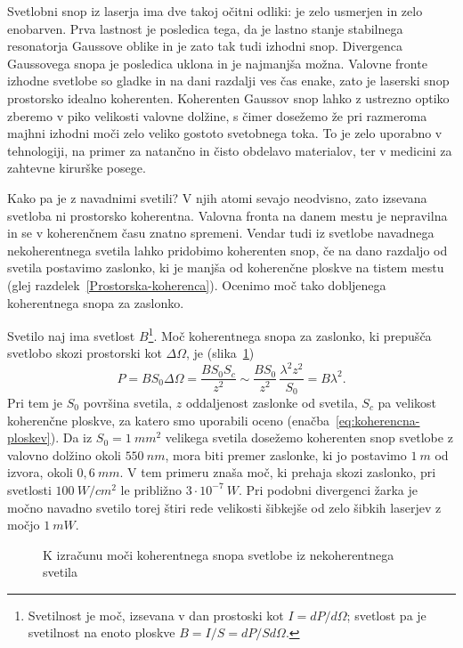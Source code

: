 Svetlobni snop iz laserja ima dve takoj očitni odliki: je zelo
usmerjen in zelo enobarven. Prva lastnost je posledica tega, da je
lastno stanje stabilnega resonatorja Gaussove oblike in je zato tak tudi
izhodni snop. Divergenca Gaussovega snopa je posledica uklona in je 
najmanjša možna. Valovne fronte izhodne svetlobe so gladke in na dani razdalji ves 
čas enake, zato je laserski snop prostorsko idealno koherenten. 
Koherenten Gaussov snop lahko z ustrezno optiko zberemo v piko velikosti
valovne dolžine, s čimer dosežemo že pri razmeroma majhni izhodni moči zelo veliko
gostoto svetobnega toka. To je zelo uporabno v tehnologiji, na primer za natančno in
čisto obdelavo materialov, ter v medicini za
zahtevne kirurške posege.

Kako pa je z navadnimi svetili? V njih atomi sevajo neodvisno, zato
izsevana svetloba ni prostorsko koherentna. Valovna fronta na danem 
mestu je nepravilna in se v koherenčnem času znatno spremeni. 
Vendar tudi iz svetlobe navadnega nekoherentnega svetila lahko pridobimo
koherenten snop, če na dano razdaljo od svetila postavimo zaslonko, ki
je manjša od koherenčne ploskve na tistem mestu (glej 
razdelek~\ref{Prostorska-koherenca}). Ocenimo moč tako dobljenega
koherentnega snopa za zaslonko.

Svetilo naj ima svetlost $B$\footnote{Svetilnost je moč, izsevana v dan 
prostoski kot $I = dP/d\Omega$; svetlost pa je svetilnost na enoto ploskve
$B=I/S = dP/Sd\Omega$.}.  
Moč koherentnega snopa za zaslonko, ki prepušča svetlobo skozi prostorski kot 
$\Delta\Omega$, je (slika~\ref{fig:svetlost})
\begin{equation}
P=BS_{0}\Delta \Omega =\frac{BS_{0}S_{c}}{z^{2}}\sim \frac{BS_{0}}{z^{2}}\,
\frac{\lambda ^{2}z^{2}}{S_{0}}=B\lambda ^{2}.
\label{5.21}
\end{equation}
Pri tem je $S_{0}$ površina svetila, $z$ oddaljenost zaslonke od svetila, 
$S_{c}$ pa velikost koherenčne ploskve, za katero smo uporabili oceno 
(enačba~\ref{eq:koherencna-ploskev}). Da iz $S_0=1~\si{mm}^2$ velikega svetila 
dosežemo koherenten snop svetlobe z valovno dolžino okoli $550~\si{nm}$, 
mora biti premer zaslonke, ki jo postavimo $1~\si{m}$ od izvora, 
okoli $0,6~\si{mm}$. V tem primeru znaša 
moč, ki prehaja skozi zaslonko, pri svetlosti $100~\si{W/cm^{2}}$ 
le približno $3\cdot10^{-7}~\si{W}$.
Pri podobni divergenci žarka je močno navadno svetilo torej štiri rede
velikosti šibkejše od zelo šibkih laserjev z močjo $1~\si{mW}$. 
\begin{figure}[h]
\centering
\def\svgwidth{100truemm} 

\caption{K izračunu moči koherentnega snopa svetlobe iz nekoherentnega svetila}
\label{fig:svetlost}
\end{figure}

